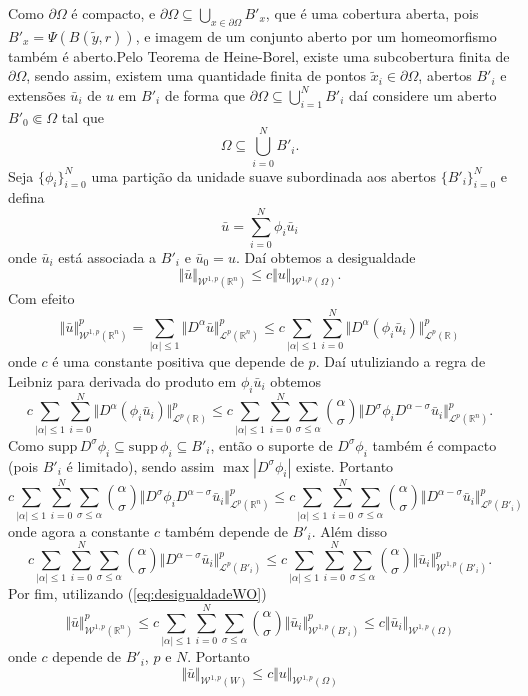 \documentclass[a4paper, 11pt]{book}
\theoremstyle{definition}
\newcommand{\bR}{\mathbb{R}}
\newcommand{\cL}{\mathcal{L}}
\newcommand{\cW}{\mathcal{W}}
\newcommand{\supp}{\mathrm{supp}\,}
\begin{document}
\begin{prf}
    Como $\partial\Omega$ é compacto, e $\partial \Omega \subseteq \bigcup_{x \in \partial\Omega} B'_x$,
    que é uma cobertura aberta, pois $B'_x = \Psi(B(\tilde y, r))$, e imagem de um conjunto aberto por um homeomorfismo também é aberto.Pelo Teorema de Heine-Borel, existe uma subcobertura finita de $\partial\Omega$,
    sendo assim, existem uma quantidade finita de pontos $\tilde x_i \in \partial\Omega$, abertos $B'_i$ e extensões $\bar u_i$ de $u$ em $B'_i$ de forma que $\partial\Omega \subseteq \bigcup_{i=1}^N B'_i$
    daí considere um aberto $B'_0 \Subset \Omega$ tal que
    \[
        \Omega \subseteq \bigcup_{i=0}^N B'_i.
    \]
    Seja $\{\phi_i\}_{i=0}^N$ uma partição da unidade suave subordinada aos abertos $\{B'_i\}_{i=0}^N$ e defina
    \[
        \bar u = \sum_{i=0}^N \phi_i \bar u_i
    \]
    onde $\bar u_i$ está associada a $B'_i$ e $\bar u_0 = u$. Daí obtemos a desigualdade
    \[
        \Vert \bar u \Vert_{\cW^{1,p}(\bR^n)} \leqslant c \Vert u \Vert_{\cW^{1,p}(\Omega)}.
    \]
    Com efeito
    \[
        \Vert \bar u \Vert^p_{\cW^{1,p}(\bR^n)} = \sum_{|\alpha| \leqslant 1} \Vert D^\alpha \bar u \Vert^p_{\cL^p(\bR^n)}
        \leqslant c\sum_{|\alpha| \leqslant 1} \sum_{i=0}^N \Vert D^\alpha (\phi_i \bar u_i) \Vert_{\cL^p(\bR)}^p
    \]
    onde $c$ é uma constante positiva que depende de $p$. Daí utuliziando a regra de Leibniz para derivada do produto em $\phi_i \bar u_i$ obtemos
    \[
        c\sum_{|\alpha| \leqslant 1} \sum_{i=0}^N \Vert D^\alpha (\phi_i \bar u_i) \Vert_{\cL^p(\bR)}^p \leqslant c\sum_{|\alpha| \leqslant 1} \sum_{i=0}^{N} \sum_{\sigma \leqslant \alpha} \binom{\alpha}{\sigma} \Vert D^\sigma \phi_i D^{\alpha - \sigma} \bar u_i \Vert_{\cL^p(\bR^n)}^p.
    \]
    Como $\supp D^\sigma \phi_i \subseteq \supp \phi_i \subseteq B'_i$, então o suporte de $D^\sigma \phi_i$ também é compacto (pois $B'_i$ é limitado), sendo assim $\max |D^\sigma \phi_i|$ existe.
    Portanto
    \[
        c\sum_{|\alpha| \leqslant 1} \sum_{i=0}^{N} \sum_{\sigma \leqslant \alpha} \binom{\alpha}{\sigma} \Vert D^\sigma \phi_i D^{\alpha - \sigma} \bar u_i \Vert_{\cL^p(\bR^n)}^p \leqslant c\sum_{|\alpha| \leqslant 1} \sum_{i=0}^{N} \sum_{\sigma \leqslant \alpha} \binom{\alpha}{\sigma} \Vert D^{\alpha - \sigma} \bar u_i \Vert_{\cL^p(B'_i)}^p
    \]
    onde agora a constante $c$ também depende de $B'_i$. Além disso
    \[
        c\sum_{|\alpha| \leqslant 1} \sum_{i=0}^{N} \sum_{\sigma \leqslant \alpha} \binom{\alpha}{\sigma} \Vert D^{\alpha - \sigma} \bar u_i \Vert_{\cL^p(B'_i)}^p \leqslant c\sum_{|\alpha| \leqslant 1} \sum_{i=0}^{N} \sum_{\sigma \leqslant \alpha} \binom{\alpha}{\sigma} \Vert \bar u_i \Vert_{\cW^{1,p}(B'_i)}^p.
    \]
    Por fim, utilizando (\ref{eq:desigualdadeWO})
    \[
         \Vert \bar u \Vert^p_{\cW^{1,p}(\bR^n)} \leqslant c\sum_{|\alpha| \leqslant 1} \sum_{i=0}^{N} \sum_{\sigma \leqslant \alpha} \binom{\alpha}{\sigma} \Vert \bar u_i \Vert_{\cW^{1,p}(B'_i)}^p \leqslant c\Vert \bar u_i \Vert_{\cW^{1,p}(\Omega)}
    \]
    onde $c$ depende de $B'_i$, $p$ e $N$.
    Portanto
    \[
        \Vert \bar u \Vert_{\cW^{1,p}(W)} \leqslant c \Vert u \Vert_{\cW^{1,p}(\Omega)}
    \]


\end{prf}
\end{document}
